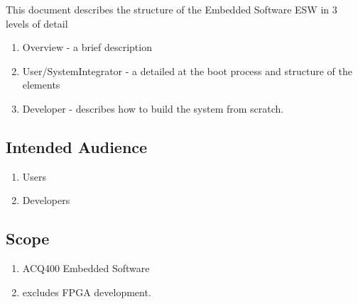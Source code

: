 \documentclass[]{article}
\begin{document}
This document describes the structure of the Embedded Software ESW in 3 levels of detail
\begin{enumerate}
    \item Overview - a brief description
    \item User/SystemIntegrator - a detailed at the boot process and structure of the elements
    \item Developer - describes how to build the system from scratch.
\end{enumerate}    

\subsection{Intended Audience}
\begin{enumerate}
    \item Users
    \item Developers
\end{enumerate}  

\subsection{Scope}
\begin{enumerate}
    \item ACQ400 Embedded Software
    \item excludes FPGA development.
\end{enumerate} 
\end{document}
